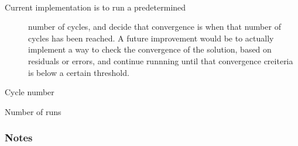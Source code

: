 \documentclass[letterpaper,10pt,english]{sphinxmanual}
\begin{document}
\begin{fulllineitems}
\label{\detokenize{autoapi/flo103_ConvergenceChecker/index:flo103_ConvergenceChecker.flo103_ConvergenceChecker}}~\begin{description}
\item[{Current implementation is to run a pre\sphinxhyphen{}determined}] \leavevmode
\sphinxAtStartPar
number of cycles, and decide that convergence is when that number
of cycles has been reached.
A future improvement would be to actually implement a way to check
the convergence of the solution, based on residuals or errors, and
continue runnning until that convergence creiteria is below a
certain threshold.

\end{description}

\begin{fulllineitems}
\label{\detokenize{autoapi/flo103_ConvergenceChecker/index:flo103_ConvergenceChecker.flo103_ConvergenceChecker.self.num_cycles}}
\sphinxAtStartPar
Cycle number

\end{fulllineitems}


\begin{fulllineitems}
\label{\detokenize{autoapi/flo103_ConvergenceChecker/index:flo103_ConvergenceChecker.flo103_ConvergenceChecker.self.n_runs}}
\sphinxAtStartPar
Number of runs

\end{fulllineitems}

\subsubsection*{Notes}


\end{fulllineitems}
\end{document}
